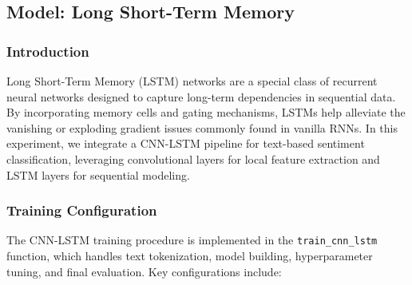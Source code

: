 \subsection{Model: Long Short-Term Memory}

\subsubsection{Introduction}

Long Short-Term Memory (LSTM) networks are a special class of recurrent neural networks designed to capture long-term dependencies in sequential data. By incorporating memory cells and gating mechanisms, LSTMs help alleviate the vanishing or exploding gradient issues commonly found in vanilla RNNs. In this experiment, we integrate a CNN-LSTM pipeline for text-based sentiment classification, leveraging convolutional layers for local feature extraction and LSTM layers for sequential modeling.

\subsubsection{Training Configuration}

The CNN-LSTM training procedure is implemented in the \texttt{train\_cnn\_lstm} function, which handles text tokenization, model building, hyperparameter tuning, and final evaluation. Key configurations include:

